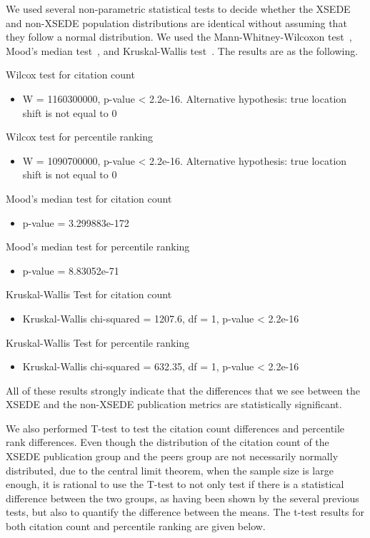 \documentclass{sig-alternate}
\begin{document}
We used several non-parametric statistical tests to decide whether the
XSEDE and non-XSEDE population distributions are identical without
assuming that they follow a normal distribution.  We used the
Mann-Whitney-Wilcoxon test~\cite{mann1947test}, Mood's median
test~\cite{brown1951median}, and Kruskal-Wallis
test~\cite{kruskal1952use}. The results are as the following.

Wilcox test for citation count
\begin{itemize}
\item W = 1160300000, p-value < 2.2e-16. Alternative hypothesis: true location shift is not equal to 0
\end{itemize}

Wilcox test for percentile ranking
\begin{itemize}
\item W = 1090700000, p-value < 2.2e-16. Alternative hypothesis: true location shift is not equal to 0
\end{itemize}

Mood's median test for citation count
\begin{itemize}
\item p-value = 3.299883e-172
\end{itemize}

Mood's median test for percentile ranking
\begin{itemize}
\item p-value = 8.83052e-71
\end{itemize}

Kruskal-Wallis Test for citation count
\begin{itemize}
\item Kruskal-Wallis chi-squared = 1207.6, df = 1, p-value < 2.2e-16
\end{itemize}

Kruskal-Wallis Test for percentile ranking
\begin{itemize}
\item Kruskal-Wallis chi-squared = 632.35, df = 1, p-value < 2.2e-16
\end{itemize}

All of these results strongly indicate that the differences that we
see between the XSEDE and the non-XSEDE publication metrics are
statistically significant.

We also performed T-test to test the
citation count differences and percentile rank differences. Even though the
distribution of the citation count of the XSEDE publication group and
the peers group are not necessarily normally distributed, due to the
central limit theorem, when the sample size is large enough, it is
rational to use the T-test to not only test if there is a statistical
difference between the two groups, as having been shown by the several
previous tests, but also to quantify the difference between the
means. The t-test results for both citation count and percentile
ranking are given below.
\end{document}
